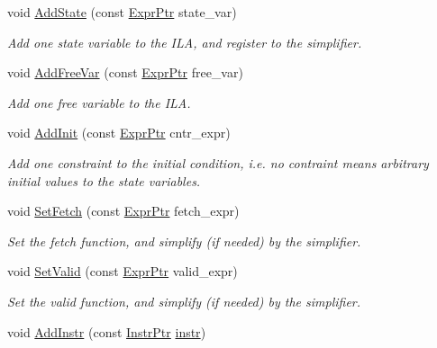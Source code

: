 \begin{DoxyCompactItemize}
void \mbox{\hyperlink{classilang_1_1_instr_lvl_abs_abb6bfd47e0dc959753337dd5fc8a44a1}{Add\+State}} (const \mbox{\hyperlink{namespaceilang_a7c4196c72e53ea4df4b7861af7bc3bce}{Expr\+Ptr}} state\+\_\+var)
\begin{DoxyCompactList}\small\item\em Add one state variable to the I\+LA, and register to the simplifier. \end{DoxyCompactList}\item 
void \mbox{\hyperlink{classilang_1_1_instr_lvl_abs_a5bbf1c23abb1f769394290e977e05df7}{Add\+Free\+Var}} (const \mbox{\hyperlink{namespaceilang_a7c4196c72e53ea4df4b7861af7bc3bce}{Expr\+Ptr}} free\+\_\+var)
\begin{DoxyCompactList}\small\item\em Add one free variable to the I\+LA. \end{DoxyCompactList}\item 
void \mbox{\hyperlink{classilang_1_1_instr_lvl_abs_acf80b0773ba82149af7c8a170219a4da}{Add\+Init}} (const \mbox{\hyperlink{namespaceilang_a7c4196c72e53ea4df4b7861af7bc3bce}{Expr\+Ptr}} cntr\+\_\+expr)
\begin{DoxyCompactList}\small\item\em Add one constraint to the initial condition, i.\+e. no contraint means arbitrary initial values to the state variables. \end{DoxyCompactList}\item 
void \mbox{\hyperlink{classilang_1_1_instr_lvl_abs_a9325202649f2dbbd2385a9e42e1356bb}{Set\+Fetch}} (const \mbox{\hyperlink{namespaceilang_a7c4196c72e53ea4df4b7861af7bc3bce}{Expr\+Ptr}} fetch\+\_\+expr)
\begin{DoxyCompactList}\small\item\em Set the fetch function, and simplify (if needed) by the simplifier. \end{DoxyCompactList}\item 
void \mbox{\hyperlink{classilang_1_1_instr_lvl_abs_a63d3f9a5566916ba4a682cbfbdaeb862}{Set\+Valid}} (const \mbox{\hyperlink{namespaceilang_a7c4196c72e53ea4df4b7861af7bc3bce}{Expr\+Ptr}} valid\+\_\+expr)
\begin{DoxyCompactList}\small\item\em Set the valid function, and simplify (if needed) by the simplifier. \end{DoxyCompactList}\item 
void \mbox{\hyperlink{classilang_1_1_instr_lvl_abs_aec2db39a4da59de361ed2d5bedc6153c}{Add\+Instr}} (const \mbox{\hyperlink{namespaceilang_af88a19312ae653d687a0d1207bb284f6}{Instr\+Ptr}} \mbox{\hyperlink{classilang_1_1_instr_lvl_abs_ad3a4b76bf3358db224b3b7413d4119d6}{instr}})

\end{DoxyCompactItemize}
